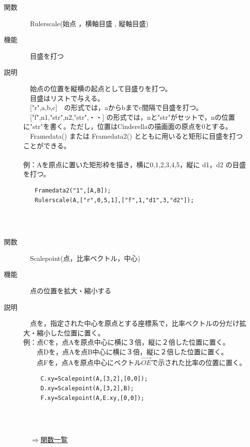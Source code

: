 \documentclass[papersize,a4paper,12pt,uplatex]{jsarticle}
\begin{document}
\begin{description}
\hypertarget{rulerscale}{}
\item[関数]　Rulerscale(始点 ，横軸目盛 , 縦軸目盛)
\item[機能]　目盛を打つ
\item[説明]　始点の位置を縦横の起点として目盛りを打つ。\\
　目盛はリストで与える。\\
　["r",a,b,c]　の形式では，aからbまでc間隔で目盛を打つ。\\
　["f",n1,"str",n2,"str",・・] の形式では，nと"str"がセットで，nの位置に"str"を書く。ただし，位置はCinderellaの描画面の原点を0とする。\\
　Framedata() または Framedata2() とともに用いると矩形に目盛を打つことができる。\\
　\\
例：Aを原点に置いた矩形枠を描き，横に0,1,2,3,4,5，縦に d1，d2 の目盛を打つ。
\begin{verbatim}
　　Framedata2("1",[A,B]);
　　Rulerscale(A,["r",0,5,1],["f",1,"d1",3,"d2"]);
\end{verbatim}　
　　　\\
　\\

\hypertarget{scalepoint}{}
\item[関数]　Scalepoint(点，比率ベクトル，中心)
\item[機能]　点の位置を拡大・縮小する
\item[説明]　点を，指定された中心を原点とする座標系で，比率ベクトルの分だけ拡大・縮小した位置に置く。\\

例：点Cを，点Aを原点中心に横に３倍，縦に２倍した位置に置く。\\
　　点Dを，点Aを点B中心に横に３倍，縦に２倍した位置に置く。\\
　　点Fを，点Aを原点中心にベクトル$\overrightarrow{OE} $で示された比率の位置に置く。
\begin{verbatim}
　　　C.xy=Scalepoint(A,[3,2],[0,0]);
　　　D.xy=Scalepoint(A,[3,2],B);
　　　F.xy=Scalepoint(A,E.xy,[0,0]);
\end{verbatim}
　　　　　\\
　\\

\begin{flushright}　\hyperlink{functionlist}{$\Rightarrow$関数一覧}\end{flushright}



\end{description}
\end{document}
